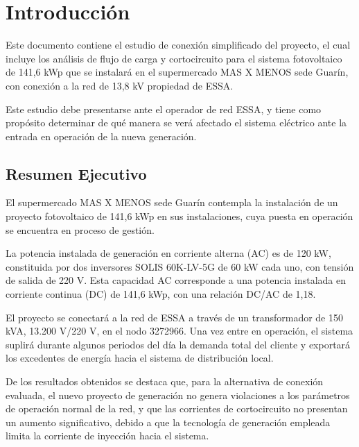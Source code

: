 \chapter{Introducción}

Este documento contiene el estudio de conexión simplificado del proyecto, el cual incluye los análisis de flujo de carga y cortocircuito para el sistema fotovoltaico de 141,6 kWp que se instalará en el supermercado MAS X MENOS sede Guarín, con conexión a la red de 13,8 kV propiedad de ESSA.

Este estudio debe presentarse ante el operador de red ESSA, y tiene como propósito determinar de qué manera se verá afectado el sistema eléctrico ante la entrada en operación de la nueva generación.

\section{Resumen Ejecutivo}

El supermercado MAS X MENOS sede Guarín contempla la instalación de un proyecto fotovoltaico de 141,6 kWp en sus instalaciones, cuya puesta en operación se encuentra en proceso de gestión.

La potencia instalada de generación en corriente alterna (AC) es de 120 kW, constituida por dos inversores SOLIS 60K-LV-5G de 60 kW cada uno, con tensión de salida de 220 V. Esta capacidad AC corresponde a una potencia instalada en corriente continua (DC) de 141,6 kWp, con una relación DC/AC de 1,18.

El proyecto se conectará a la red de ESSA a través de un transformador de 150 kVA, 13.200 V/220 V, en el nodo 3272966. Una vez entre en operación, el sistema suplirá durante algunos periodos del día la demanda total del cliente y exportará los excedentes de energía hacia el sistema de distribución local.

De los resultados obtenidos se destaca que, para la alternativa de conexión evaluada, el nuevo proyecto de generación no genera violaciones a los parámetros de operación normal de la red, y que las corrientes de cortocircuito no presentan un aumento significativo, debido a que la tecnología de generación empleada limita la corriente de inyección hacia el sistema.
